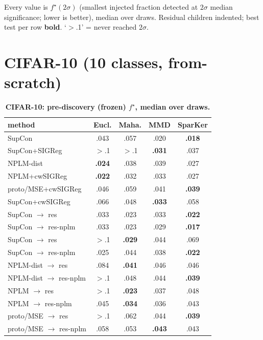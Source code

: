 \documentclass[10pt]{article}
\begin{document}
Every value is $f^\star(2\sigma)$ (smallest injected fraction detected at $2\sigma$ median significance; lower is better), median over draws. Residual children indented; best test per row \textbf{bold}. `$>$.1' = never reached $2\sigma$.
\clearpage\section*{CIFAR-10 (10 classes, from-scratch)}
\begin{table}[t]
\centering
\footnotesize

\begin{tabular}{lcccc}
\toprule
method & Eucl. & Maha. & MMD & SparKer \\
\midrule
SupCon & .043 & .057 & .020 & \textbf{.018} \\
SupCon+SIGReg & $>$.1 & $>$.1 & \textbf{.031} & .037 \\
NPLM-dist & \textbf{.024} & .038 & .039 & .027 \\
NPLM+cwSIGReg & \textbf{.022} & .032 & .033 & .027 \\
proto/MSE+cwSIGReg & .046 & .059 & .041 & \textbf{.039} \\
SupCon+cwSIGReg & .066 & .048 & \textbf{.033} & .058 \\
\quad SupCon $\to$ res & .033 & .023 & .033 & \textbf{.022} \\
\quad SupCon $\to$ res-nplm & .033 & .023 & .029 & \textbf{.017} \\
\quad SupCon $\to$ res & $>$.1 & \textbf{.029} & .044 & .069 \\
\quad SupCon $\to$ res-nplm & .025 & .044 & .038 & \textbf{.022} \\
\quad NPLM-dist $\to$ res & .084 & \textbf{.041} & .046 & .046 \\
\quad NPLM-dist $\to$ res-nplm & $>$.1 & .048 & .044 & \textbf{.039} \\
\quad NPLM $\to$ res & $>$.1 & \textbf{.023} & .037 & .048 \\
\quad NPLM $\to$ res-nplm & .045 & \textbf{.034} & .036 & .043 \\
\quad proto/MSE $\to$ res & $>$.1 & .062 & .044 & \textbf{.039} \\
\quad proto/MSE $\to$ res-nplm & .058 & .053 & \textbf{.043} & .043 \\
\bottomrule
\end{tabular}

\caption{\textbf{CIFAR-10: pre-discovery (frozen) $f^\star$, median over draws.}}
\label{tab:CIFAR-10pre}
\end{table}
\end{document}
